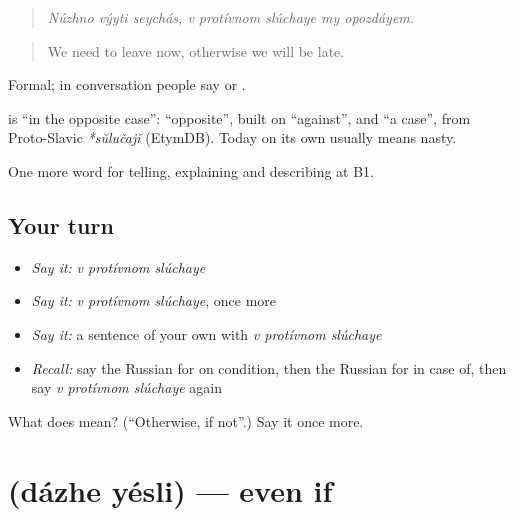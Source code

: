 \begin{quote}
\emph{Núzhno výyti seychás, v protívnom slúchaye my opozdáyem.}
\end{quote}

\begin{quote}
We need to leave now, otherwise we will be late.
\end{quote}

Formal; in conversation people say \emph{} or \emph{ }.

\begin{cousinweb}
\textbf{  } is \textquotedblleft{}in the opposite case\textquotedblright{}: \emph{} \textquotedblleft{}opposite\textquotedblright{}, built on \emph{} \textquotedblleft{}against\textquotedblright{}, and \emph{} \textquotedblleft{}a case\textquotedblright{}, from Proto-Slavic \emph{*sŭlučajĭ} (EtymDB). Today \emph{} on its own usually means nasty.
\end{cousinweb}

\begin{grammarlens}[title={What you've built}]
One more word for telling, explaining and describing at B1.
\end{grammarlens}

\subsection*{Your turn}
\begin{itemize}
\raggedright
  \item \emph{Say it:} \emph{v protívnom slúchaye}
  \item \emph{Say it:} \emph{v protívnom slúchaye}, once more
  \item \emph{Say it:} a sentence of your own with \emph{v protívnom slúchaye}
  \item \emph{Recall:} say the Russian for on condition, then the Russian for in case of, then say \emph{v protívnom slúchaye} again
\end{itemize}

\begin{tcolorbox}[breakable,colback=teal!4,colframe=teal!35!black,title={Before you move on}]
What does    mean? (\textquotedblleft{}Otherwise, if not\textquotedblright{}.) Say it once more.
\end{tcolorbox}
\section[\texorpdfstring{\ru{даже} \ru{если} (dázhe yésli)}{даже если (dázhe yésli)}]{  (dázhe yésli) — even if}

